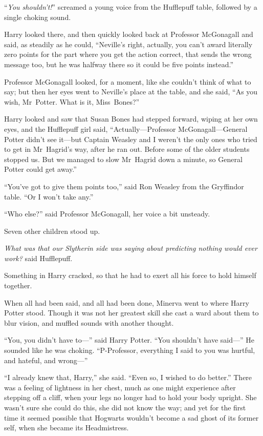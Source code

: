 “\emph{You shouldn’t!}” screamed a young voice from the Hufflepuff table, followed by a single choking sound.

Harry looked there, and then quickly looked back at Professor McGonagall and said, as steadily as he could,
“Neville’s right, actually, you can’t award literally zero points for the part where you get the action correct, that sends the wrong message too, but he was halfway there so it could be five points instead.”

Professor McGonagall looked, for a moment, like she couldn’t think of what to say; but then her eyes went to Neville’s place at the table, and she said,
“As you wish, Mr~Potter. What is it, Miss~Bones?”

Harry looked and saw that Susan Bones had stepped forward, wiping at her own eyes, and the Hufflepuff girl said,
“Actually—Professor McGonagall—General Potter didn’t see it—but Captain Weasley and I weren’t the only ones who tried to get in Mr~Hagrid’s way, after he ran out. Before some of the older students stopped us. But we managed to slow Mr~Hagrid down a minute, so General Potter could get away.”

“You’ve got to give them points too,” said Ron Weasley from the Gryffindor table.
“Or I won’t take any.”

“Who else?” said Professor McGonagall, her voice a bit unsteady.

Seven other children stood up.

\emph{What was that our Slytherin side was saying about predicting nothing would ever work?} said Hufflepuff.

Something in Harry cracked, so that he had to exert all his force to hold himself together.

\later

When all had been said, and all had been done, Minerva went to where Harry Potter stood. Though it was not her greatest skill she cast a ward about them to blur vision, and muffled sounds with another thought.

“You, you didn’t have to—” said Harry Potter.
“You shouldn’t have said—” He sounded like he was choking.
“P-Professor, everything I said to you was hurtful, and hateful, and wrong—”

“I already knew that, Harry,” she said.
“Even so, I wished to do better.” There was a feeling of lightness in her chest, much as one might experience after stepping off a cliff, when your legs no longer had to hold your body upright. She wasn’t sure she could do this, she did not know the way; and yet for the first time it seemed possible that Hogwarts wouldn’t become a sad ghost of its former self, when she became its Headmistress.

